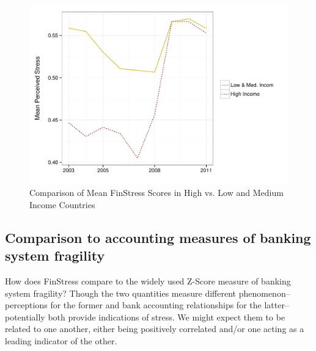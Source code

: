 \documentclass[]{article}
\begin{document}
\begin{figure}
    \caption{Comparison of Mean FinStress Scores in High vs. Low and Medium Income Countries}
    \label{comp_dev_developing}

    \begin{center}
        \includegraphics[scale=0.45]{figures/dev_vs_devoloping.pdf}
    \end{center}
\end{figure}

\subsection{Comparison to accounting measures of banking system fragility}

How does FinStress compare to the widely used Z-Score measure of banking system fragility? Though the two quantities measure different phenomenon--perceptions for the former and bank accounting relationships for the latter--potentially both provide indications of stress. We might expect them to be related to one another, either being positively correlated and/or one acting as a leading indicator of the other.
\end{document}
